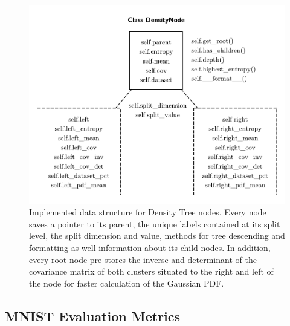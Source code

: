 \documentclass[10pt]{article}
\begin{document}
\begin{figure}[H]
    \centering
    \includegraphics[width=.6\textwidth]{density-node}
    \caption{Implemented data structure for Density Tree nodes. Every node saves a pointer to its parent, the unique labels contained at its split level, the split dimension and value, methods for tree descending and formatting as well information about its child nodes. In addition, every root node pre-stores the inverse and determinant of the covariance matrix of both clusters situated to the right and left of the node for faster calculation of the Gaussian \gls{PDF}.}
    \label{fig:density-node}
\end{figure}

\subsection{MNIST Evaluation Metrics}
\label{subsec:app-eval-mnist}
\end{document}
